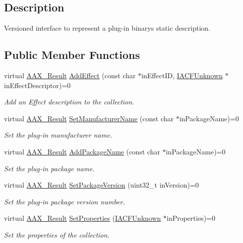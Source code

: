 \subsection{Description}
Versioned interface to represent a plug-\/in binary\textquotesingle{}s static description. \subsection*{Public Member Functions}
\begin{DoxyCompactItemize}
\item 
virtual \mbox{\hyperlink{a00392_a4d8f69a697df7f70c3a8e9b8ee130d2f}{A\+A\+X\+\_\+\+Result}} \mbox{\hyperlink{a01621_a0fdba73ff6279df807ceac3486ab7630}{Add\+Effect}} (const char $\ast$in\+Effect\+ID, \mbox{\hyperlink{a01409}{I\+A\+C\+F\+Unknown}} $\ast$in\+Effect\+Descriptor)=0
\begin{DoxyCompactList}\small\item\em Add an Effect description to the collection. \end{DoxyCompactList}\item 
virtual \mbox{\hyperlink{a00392_a4d8f69a697df7f70c3a8e9b8ee130d2f}{A\+A\+X\+\_\+\+Result}} \mbox{\hyperlink{a01621_af3758a6741780e575fa36b95e9716072}{Set\+Manufacturer\+Name}} (const char $\ast$in\+Package\+Name)=0
\begin{DoxyCompactList}\small\item\em Set the plug-\/in manufacturer name. \end{DoxyCompactList}\item 
virtual \mbox{\hyperlink{a00392_a4d8f69a697df7f70c3a8e9b8ee130d2f}{A\+A\+X\+\_\+\+Result}} \mbox{\hyperlink{a01621_ae8087ce7d0b9c4d1d2e6d14616a67208}{Add\+Package\+Name}} (const char $\ast$in\+Package\+Name)=0
\begin{DoxyCompactList}\small\item\em Set the plug-\/in package name. \end{DoxyCompactList}\item 
virtual \mbox{\hyperlink{a00392_a4d8f69a697df7f70c3a8e9b8ee130d2f}{A\+A\+X\+\_\+\+Result}} \mbox{\hyperlink{a01621_a4276dc11c5036797a75a66fd49e12839}{Set\+Package\+Version}} (uint32\+\_\+t in\+Version)=0
\begin{DoxyCompactList}\small\item\em Set the plug-\/in package version number. \end{DoxyCompactList}\item 
virtual \mbox{\hyperlink{a00392_a4d8f69a697df7f70c3a8e9b8ee130d2f}{A\+A\+X\+\_\+\+Result}} \mbox{\hyperlink{a01621_a413165097cbab9087294a694d52cf12a}{Set\+Properties}} (\mbox{\hyperlink{a01409}{I\+A\+C\+F\+Unknown}} $\ast$in\+Properties)=0
\begin{DoxyCompactList}\small\item\em Set the properties of the collection. \end{DoxyCompactList}\end{DoxyCompactItemize}


